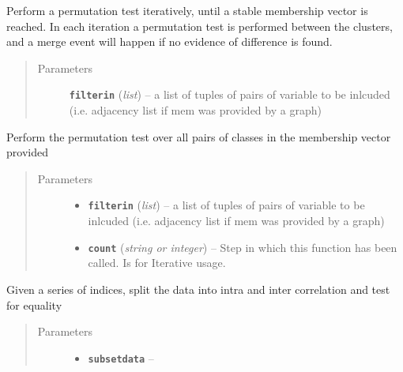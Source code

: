 \documentclass[letterpaper,10pt,english]{sphinxmanual}
\begin{document}
\begin{fulllineitems}
\begin{fulllineitems}
\label{Doc:Moduler.SupportClustering.iterative_permt}
Perform a permutation test iteratively, until a stable membership vector is reached. In each iteration
a permutation test is performed between the clusters, and a merge event will happen if no evidence of
difference is found.
\begin{quote}\begin{description}
\item[{Parameters}] \leavevmode
\textbf{\texttt{filterin}} (\emph{list}) -- a list of tuples of pairs of variable to be inlcuded (i.e. adjacency list if mem was provided by a graph)

\end{description}\end{quote}

\end{fulllineitems}


\begin{fulllineitems}
\label{Doc:Moduler.SupportClustering.permt}
Perform the permutation test over all pairs of classes in the membership vector provided
\begin{quote}\begin{description}
\item[{Parameters}] \leavevmode\begin{itemize}
\item {} 
\textbf{\texttt{filterin}} (\emph{list}) -- a list of tuples of pairs of variable to be inlcuded (i.e. adjacency list if mem was provided by a graph)

\item {} 
\textbf{\texttt{count}} (\emph{string or integer}) -- Step in which this function has been called. Is for Iterative usage.

\end{itemize}

\end{description}\end{quote}

\end{fulllineitems}


\begin{fulllineitems}
\label{Doc:Moduler.SupportClustering.subsetTest}
Given a series of indices, split the data into intra and inter correlation
and test for equality
\begin{quote}\begin{description}
\item[{Parameters}] \leavevmode\begin{itemize}
\item {} 
\textbf{\texttt{subsetdata}} -- 


\end{itemize}
\end{description}
\end{quote}
\end{fulllineitems}
\end{fulllineitems}
\end{document}
